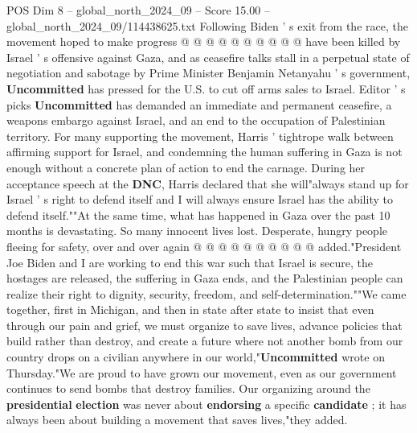 \begin{textsample}{POS Dim 8 – global\_north\_2024\_09 – Score 15.00 – global\_north\_2024\_09/114438625.txt}
Following Biden ' s exit from the race, the movement hoped to make progress @ @ @ @ @ @ @ @ @ @ have been killed by Israel ' s offensive against Gaza, and as ceasefire talks stall in a perpetual state of negotiation and sabotage by Prime Minister Benjamin Netanyahu ' s government, \textbf{Uncommitted} has pressed for the U.S. to cut off arms sales to Israel.
Editor ' s picks \textbf{Uncommitted} has demanded an immediate and permanent ceasefire, a weapons embargo against Israel, and an end to the occupation of Palestinian territory.
For many supporting the movement, Harris ' tightrope walk between affirming support for Israel, and condemning the human suffering in Gaza is not enough without a concrete plan of action to end the carnage.
During her acceptance speech at the \textbf{DNC}, Harris declared that she will"always stand up for Israel ' s right to defend itself and I will always ensure Israel has the ability to defend itself.""At the same time, what has happened in Gaza over the past 10 months is devastating.
So many innocent lives lost.
Desperate, hungry people fleeing for safety, over and over again @ @ @ @ @ @ @ @ @ @ added."President Joe Biden and I are working to end this war such that Israel is secure, the hostages are released, the suffering in Gaza ends, and the Palestinian people can realize their right to dignity, security, freedom, and self-determination.""We came together, first in Michigan, and then in state after state to insist that even through our pain and grief, we must organize to save lives, advance policies that build rather than destroy, and create a future where not another bomb from our country drops on a civilian anywhere in our world,"\textbf{Uncommitted} wrote on Thursday."We are proud to have grown our movement, even as our government continues to send bombs that destroy families.
Our organizing around the \textbf{presidential} \textbf{election} was never about \textbf{endorsing} a specific \textbf{candidate} ; it has always been about building a movement that saves lives,"they added.

\end{textsample}
